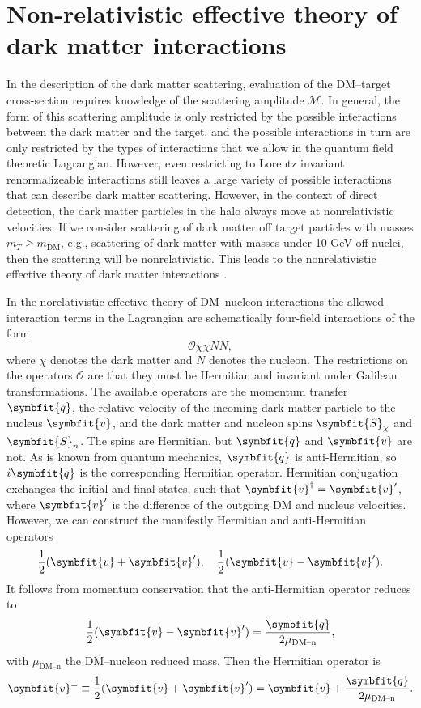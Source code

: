 \documentclass[b5paper, 10pt, twoside]{book}
\renewcommand{\vec}[1]{\symbfit{#1}}
\begin{document}
\chapter{Non-relativistic effective theory of dark matter interactions}

In the description of the dark matter scattering, evaluation of the DM--target cross-section requires knowledge of the scattering amplitude $\mathcal{M}$. In general, the form of this scattering amplitude is only restricted by the possible interactions between the dark matter and the target, and the possible interactions in turn are only restricted by the types of interactions that we allow in the quantum field theoretic Lagrangian. However, even restricting to Lorentz invariant renormalizeable interactions still leaves a large variety of possible interactions that can describe dark matter scattering. However, in the context of direct detection, the dark matter particles in the halo always move at nonrelativistic velocities. If we consider scattering of dark matter off target particles with masses $m_T\geq m_\text{DM}$, e.g., scattering of dark matter with masses under 10 GeV off nuclei, then the scattering will be nonrelativistic. This leads to the nonrelativistic effective theory of dark matter interactions \parencite{FitzpatrickEtAl2013}.

In the norelativistic effective theory of DM--nucleon interactions the allowed interaction terms in the Lagrangian are schematically four-field interactions of the form
\begin{equation}
\mathcal{O}\chi\chi NN,
\end{equation}
where $\chi$ denotes the dark matter and $N$ denotes the nucleon. The restrictions on the operators $\mathcal{O}$ are that they must be Hermitian and invariant under Galilean transformations. The available operators are the momentum transfer $\vec{q}$, the relative velocity of the incoming dark matter particle to the nucleus $\vec{v}$, and the dark matter and nucleon spins $\vec{S}_\chi$ and $\vec{S}_n$. The spins are Hermitian, but $\vec{q}$ and $\vec{v}$ are not. As is known from quantum mechanics, $\vec{q}$ is anti-Hermitian, so $i\vec{q}$ is the corresponding Hermitian operator. Hermitian conjugation exchanges the initial and final states, such that $\vec{v}^\dagger=\vec{v}'$, where $\vec{v}'$ is the difference of the outgoing DM and nucleus velocities. However, we can construct the manifestly Hermitian and anti-Hermitian operators
\begin{equation}
\frac{1}{2}(\vec{v}+\vec{v}'),\quad\frac{1}{2}(\vec{v}-\vec{v}').
\end{equation}
It follows from momentum conservation that the anti-Hermitian operator reduces to
\begin{equation}
\frac{1}{2}(\vec{v}-\vec{v}')=\frac{\vec{q}}{2\mu_\text{DM--n}},
\end{equation}
with $\mu_\text{DM--n}$ the DM--nucleon reduced mass. Then the Hermitian operator is
\begin{equation}
\vec{v}^\perp\equiv\frac{1}{2}(\vec{v}+\vec{v}')=\vec{v}+\frac{\vec{q}}{2\mu_\text{DM--n}}.
\end{equation}
\end{document}

